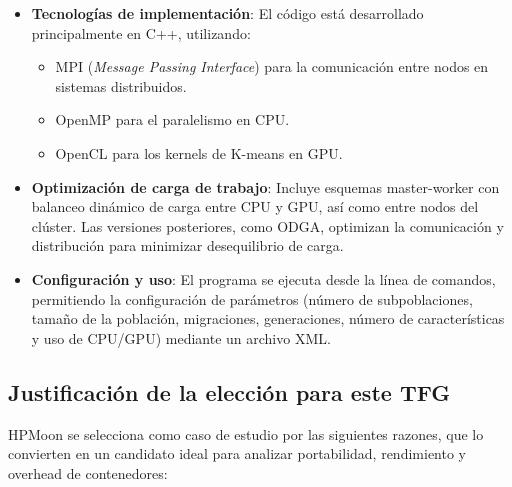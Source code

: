 \begin{itemize}
    \item \textbf{Tecnologías de implementación}: El código está desarrollado principalmente en C++, utilizando:
          \begin{itemize}
              \item \acs{MPI} (\textit{Message Passing Interface}) para la comunicación entre nodos en sistemas distribuidos.
              \item \acs{OpenMP} para el paralelismo en CPU.
              \item \acs{OpenCL} para los kernels de K-means en GPU.
          \end{itemize}
    \item \textbf{Optimización de carga de trabajo}: Incluye esquemas master-worker con balanceo dinámico de carga entre CPU y GPU, así como entre nodos del clúster. Las versiones posteriores, como ODGA, optimizan la comunicación y distribución para minimizar desequilibrio de carga.
    \item \textbf{Configuración y uso}: El programa se ejecuta desde la línea de comandos, permitiendo la configuración de parámetros (número de subpoblaciones, tamaño de la población, migraciones, generaciones, número de características y uso de CPU/GPU) mediante un archivo XML.
\end{itemize}

\subsection{Justificación de la elección para este TFG}\label{subsec:hpm_justificacion}
HPMoon se selecciona como caso de estudio por las siguientes razones, que lo convierten en un candidato ideal para analizar portabilidad, rendimiento y overhead de contenedores:

